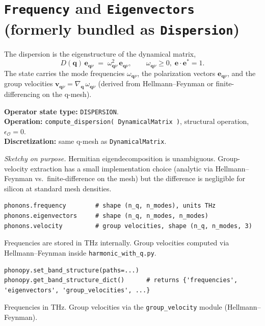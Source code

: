 \documentclass[11pt,a4paper]{article}
\begin{document}
\section{\texttt{Frequency} and \texttt{Eigenvectors} (formerly bundled as \texttt{Dispersion})}

\begin{abstractbox}
The dispersion is the eigenstructure of the dynamical matrix,
\begin{equation}
  D(\mathbf{q})\,\mathbf{e}_{\mathbf{q}\nu} \;=\; \omega^2_{\mathbf{q}\nu}\,\mathbf{e}_{\mathbf{q}\nu},
  \qquad \omega_{\mathbf{q}\nu} \geq 0,\; \mathbf{e}\cdot\mathbf{e}^* = 1.
\end{equation}
The state carries the mode frequencies $\omega_{\mathbf{q}\nu}$, the polarization vectors
$\mathbf{e}_{\mathbf{q}\nu}$, and the group velocities
$\mathbf{v}_{\mathbf{q}\nu} = \nabla_{\mathbf{q}}\,\omega_{\mathbf{q}\nu}$ (derived from
Hellmann--Feynman or finite-differencing on the q-mesh).

\medskip
\textbf{Operator state type:} \texttt{DISPERSION}.\\
\textbf{Operation:} \texttt{compute\_dispersion(\,DynamicalMatrix\,)}, structural operation,
$\epsilon_{\mathcal{O}} = 0$.\\
\textbf{Discretization:} same q-mesh as \texttt{DynamicalMatrix}.

\medskip
\textit{Sketchy on purpose.} Hermitian eigendecomposition is unambiguous. Group-velocity
extraction has a small implementation choice (analytic via Hellmann--Feynman vs.\
finite-difference on the mesh) but the difference is negligible for silicon at standard mesh
densities.
\end{abstractbox}

\begin{kaldobox}
\begin{verbatim}
phonons.frequency        # shape (n_q, n_modes), units THz
phonons.eigenvectors     # shape (n_q, n_modes, n_modes)
phonons.velocity         # group velocities, shape (n_q, n_modes, 3)
\end{verbatim}
Frequencies are stored in THz internally. Group velocities computed via Hellmann--Feynman
inside \texttt{harmonic\_with\_q.py}.
\end{kaldobox}

\begin{phonobox}
\begin{verbatim}
phonopy.set_band_structure(paths=...)
phonopy.get_band_structure_dict()      # returns {'frequencies', 'eigenvectors', 'group_velocities', ...}
\end{verbatim}
Frequencies in THz. Group velocities via the \texttt{group\_velocity} module (Hellmann--Feynman).
\end{phonobox}
\end{document}
